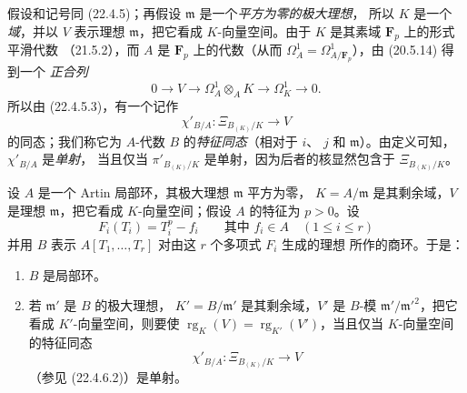 \begin{env}[22.4.6]
\label{0.22.4.6-fr}
假设和记号同 (22.4.5)；再假设 $\mathfrak m$ 是一个\emph{平方为零的极大理想}，
所以 $K$ 是一个\emph{域}，并以 $V$ 表示理想 $\mathfrak m$，把它看成
$K$-向量空间。由于 $K$ 是其素域 $\mathbf F_p$ 上的形式平滑代数
（21.5.2），而 $A$ 是 $\mathbf F_p$ 上的代数（从而
$\Omega^1_A=\Omega^1_{A/\mathbf F_p}$），由 (20.5.14) 得到一个
\emph{正合列}
\begin{equation}
\label{0.22.4.6.1-fr}
  0\longrightarrow V\longrightarrow\Omega^1_A\otimes_AK
  \longrightarrow\Omega^1_K\longrightarrow0.
  \tag{22.4.6.1}
\end{equation}
所以由 (22.4.5.3)，有一个记作
\begin{equation}
\label{0.22.4.6.2-fr}
  \chi'_{B/A}:\Xi_{B_{(K)}/K}\longrightarrow V
  \tag{22.4.6.2}
\end{equation}
的同态；我们称它为 $A$-代数 $B$ 的\emph{特征同态}（相对于 $i$、
$j$ 和 $\mathfrak m$）。由定义可知，$\chi'_{B/A}$ 是\emph{单射}，
当且仅当 $\pi'_{B_{(K)}/K}$ 是单射，因为后者的核显然包含于
$\Xi_{B_{(K)}/K}$。
\end{env}

\begin{proposition}[22.4.7]
\label{0.22.4.7-fr}
设 $A$ 是一个 Artin 局部环，其极大理想 $\mathfrak m$ 平方为零，
$K=A/\mathfrak m$ 是其剩余域，$V$ 是理想 $\mathfrak m$，把它看成
$K$-向量空间；假设 $A$ 的特征为 $p>0$。设
\begin{equation}
\label{0.22.4.7.1-fr}
  F_i(T_i)=T_i^p-f_i\qquad\text{其中 }f_i\in A\quad(1\leqslant i\leqslant r)
  \tag{22.4.7.1}
\end{equation}
并用 $B$ 表示 $A[T_1,\ldots,T_r]$ 对由这 $r$ 个多项式 $F_i$ 生成的理想
所作的商环。于是：
\begin{enumerate}
  \item[\rm(i)] $B$ 是局部环。
  \item[\rm(ii)] 若 $\mathfrak m'$ 是 $B$ 的极大理想，
  $K'=B/\mathfrak m'$ 是其剩余域，$V'$ 是 $B$-模
  $\mathfrak m'/\mathfrak m'^2$，把它看成 $K'$-向量空间，则要使
  $\operatorname{rg}_K(V)=\operatorname{rg}_{K'}(V')$，当且仅当
  $K$-向量空间的特征同态
  \begin{equation}
  \label{0.22.4.7.2-fr}
    \chi'_{B/A}:\Xi_{B_{(K)}/K}\longrightarrow V
    \tag{22.4.7.2}
  \end{equation}
  （参见 (22.4.6.2)）是单射。
\end{enumerate}
\end{proposition}

